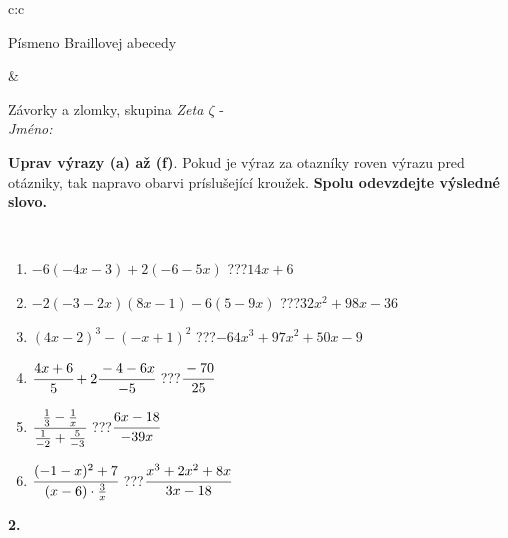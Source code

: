 \documentclass[10pt]{report}
\begin{document}
\begin{tabular}{c:c}
\begin{minipage}[c][104.5mm][t]{0.5\linewidth}
\begin{center}
\begin{minipage}{0.20\linewidth}
\begin{center}
{\small Písmeno Braillovej abecedy}
\end{center}
\end{minipage}
\end{center}
\end{minipage}
&
\begin{minipage}[c][104.5mm][t]{0.5\linewidth}
\begin{center}
\vspace{7mm}
{\huge Závorky a zlomky, skupina \textit{Zeta $\zeta$} -}\\[5mm]
\textit{Jméno:}\phantom{xxxxxxxxxxxxxxxxxxxxxxxxxxxxxxxxxxxxxxxxxxxxxxxxxxxxxxxxxxxxxxxxx}\\[5mm]
\begin{minipage}{0.95\linewidth}
\begin{center}
\textbf{Uprav výrazy (a) až (f)}. Pokud je výraz za otazníky roven výrazu pred otázniky, tak napravo obarvi príslušející kroužek. \textbf{Spolu odevzdejte výsledné slovo.}
\end{center}
\end{minipage}
\\[1mm]
\begin{minipage}{0.79\linewidth}
\begin{center}
\begin{varwidth}{\linewidth}
\begin{enumerate}
\normalsize
\item $-6(-4x-3)+2(-6-5x)$\quad \dotfill\; ???\;\dotfill \quad $14x+6$
\item $-2(-3-2x)(8x-1)-6(5-9x)$\quad \dotfill\; ???\;\dotfill \quad $32x^2+98x-36$
\item $(4x-2)^3-(-x+1)^2$\quad \dotfill\; ???\;\dotfill \quad $-64x^3+97x^2+50x-9$
\item $\cfrac{4x+6}{5}+2\cfrac{-4-6x}{-5}$\quad \dotfill\; ???\;\dotfill \quad $\cfrac{-70}{25}$
\item $\cfrac{\frac{1}{3}-\frac{1}{x}}{\frac{1}{-2}+\frac{5}{-3}}$\quad \dotfill\; ???\;\dotfill \quad $\cfrac{6x-18}{-39x}$
\item $\cfrac{(-1-x)^2+7}{(x-6)\cdot\frac{3}{x}}$\quad \dotfill\; ???\;\dotfill \quad $\cfrac{x^3+2x^2+8x}{3x-18}$
\end{enumerate}
\end{varwidth}
\end{center}
\end{minipage}
\begin{minipage}{0.20\linewidth}
\begin{center}
{\Huge\bfseries 2.} \\[2mm]

\end{center}
\end{minipage}
\end{center}
\end{minipage}
\end{tabular}
\end{document}
